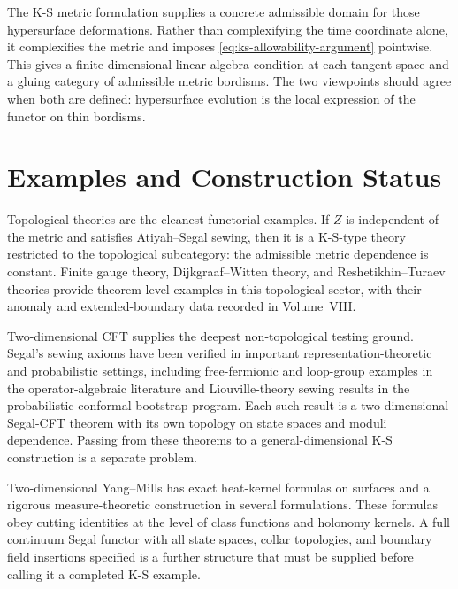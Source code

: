The K-S metric formulation supplies a concrete admissible domain for those
hypersurface deformations.  Rather than complexifying the time coordinate
alone, it complexifies the metric and imposes
\eqref{eq:ks-allowability-argument} pointwise.  This gives a finite-dimensional
linear-algebra condition at each tangent space and a gluing category of
admissible metric bordisms.  The two viewpoints should agree when both are
defined: hypersurface evolution is the local expression of the functor on
thin bordisms.

\section{Examples and Construction Status}

Topological theories are the cleanest functorial examples.  If \(Z\) is
independent of the metric and satisfies Atiyah--Segal sewing, then it is a
K-S-type theory restricted to the topological subcategory: the admissible
metric dependence is constant.  Finite gauge theory, Dijkgraaf--Witten
theory, and Reshetikhin--Turaev theories provide theorem-level examples in
this topological sector, with their anomaly and extended-boundary data
recorded in Volume~VIII.

Two-dimensional CFT supplies the deepest non-topological testing ground.
Segal's sewing axioms have been verified in important representation-theoretic
and probabilistic settings, including free-fermionic and loop-group examples
in the operator-algebraic literature and Liouville-theory sewing results in
the probabilistic conformal-bootstrap program.  Each such result is a
two-dimensional Segal-CFT theorem with its own topology on state spaces and
moduli dependence.  Passing from these theorems to a general-dimensional K-S
construction is a separate problem.

Two-dimensional Yang--Mills has exact heat-kernel formulas on surfaces and a
rigorous measure-theoretic construction in several formulations.  These
formulas obey cutting identities at the level of class functions and
holonomy kernels.  A full continuum Segal functor with all state spaces,
collar topologies, and boundary field insertions specified is a further
structure that must be supplied before calling it a completed K-S example.

